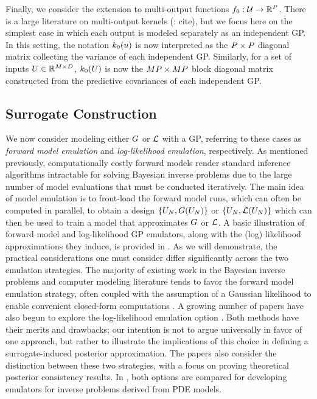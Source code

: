 \documentclass[12pt]{article}
\begin{document}
Finally, we consider the extension to multi-output functions $f_{0}: \mathcal{U} \to \mathbb{R}^{P}$. There is a large literature on multi-output 
kernels (\todo: cite), but we focus here on the simplest case in which each output is modeled separately as an independent GP. 
In this setting, the notation $k_0(u)$ is now interpreted as the $P \times P$ diagonal matrix collecting the variance of each 
independent GP. Similarly, for a set of inputs $U \in \mathbb{R}^{M \times D}$, $k_0(U)$ is now the 
$MP \times MP$ block diagonal matrix constructed from the predictive covariances of each independent GP. 

\subsection{Surrogate Construction}
We now consider modeling either $G$ or $\mathcal{L}$ with a GP, referring to these cases as \textit{forward model emulation} and 
\textit{log-likelihood emulation}, respectively. As mentioned previously, computationally costly forward models render 
standard inference algorithms intractable for solving Bayesian inverse problems due to the large number of model 
evaluations that must be conducted iteratively. The main idea of model emulation is to front-load the forward model 
runs, which can often be computed in parallel, to obtain a design $\{U_{N}, G(U_{N})\}$ or 
$\{U_{N}, \mathcal{L}(U_{N})\}$ which can then be used to train a model that 
approximates $G$ or $\mathcal{L}$. A basic illustration of forward model and log-likelihood GP emulators, along with the 
(log) likelihood approximations they induce, is provided in . 
As we will demonstrate, the practical considerations one must consider differ significantly across the two emulation 
strategies. The majority of existing work in the Bayesian inverse problems and computer modeling literature tends 
to favor the forward model emulation strategy, often coupled with the assumption of a Gaussian likelihood to enable
convenient closed-form computations \citep{HigdonBasis,functionValuedModels,hydrologicalModel,VillaniAdaptiveGP}. 
A growing number of papers have also begun to explore the log-likelihood emulation option 
\citep{VehtariParallelGP,gp_surrogates_random_exploration,FerEmulation,ActiveLearningMCMC,quantileApprox,llikRBF,trainDynamics,MCMC_GP_proposal,landslideCalibration,Kandasamy_2017,wang2018adaptive}. 
Both methods have their merits and drawbacks; our intention is not to argue universally in favor of one approach, but rather
to illustrate the implications of this choice in defining a surrogate-induced posterior approximation. The papers 
\citet{StuartTeck1,StuartTeck2,random_fwd_models} also consider the distinction between these two strategies, 
with a focus on proving theoretical posterior consistency results. In \citet{GP_PDE_priors}, both options are compared 
for developing emulators for inverse problems derived from PDE models.
\end{document}
